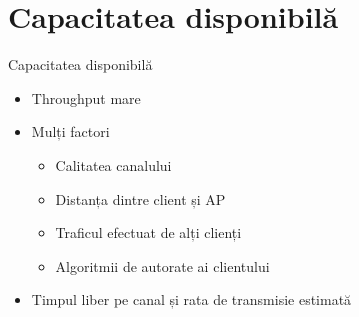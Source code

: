 \section{Capacitatea disponibilă}

\begin{frame}{Capacitatea disponibilă}
  \begin{itemize}
    \item Throughput mare
    \item Mulți factori
    \begin{itemize}
      \item Calitatea canalului
      \item Distanța dintre client și AP
      \item Traficul efectuat de alți clienți
      \item Algoritmii de autorate ai clientului
    \end{itemize}
    \item Timpul liber pe canal și rata de transmisie estimată
  \end{itemize}
\end{frame}

